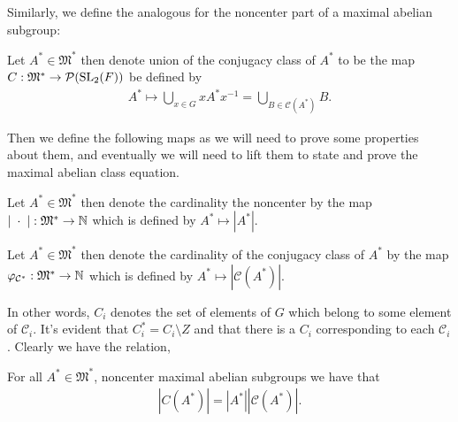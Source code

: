 Similarly, we define the analogous for the noncenter part of a maximal abelian subgroup:

\begin{definition}
  \label{noncenter_C}
  \leanok
  Let $A^* \in \mathfrak{M}^*$ then denote union of the conjugacy class of $A^*$ to be the
  map $C : \mathfrak{M}^* \rightarrow \mathcal{P}(\operatorname{SL}_2(F))$ be defined by
\begin{align*}
  A^* \mapsto \bigcup_{x \in G} x A^* x^{-1} = \bigcup_{B \in \mathcal{C}(A^*)} B.
\end{align*}
\end{definition}

Then we define the following maps as we will need to prove some properties about them, and eventually we will need to lift them to
state and prove the maximal abelian class equation.


\begin{definition}
  \label{card_noncenter}
  Let $A^* \in \mathfrak{M}^*$ then denote the cardinality the noncenter 
  by the map $| \; \cdot \; | : \mathfrak{M}^* \rightarrow \mathbb{N}$ which is defined by $A^* \mapsto |A^*|$.
\end{definition}

\begin{definition}
  \label{card_noncenter_ConjClassOfSet}
  Let $A^* \in \mathfrak{M}^*$ then denote the cardinality of the conjugacy class of $A^*$
  by the map $\varphi_{\mathcal{C}^*} : \mathfrak{M}^* \rightarrow \mathbb{N}$  which is defined by $A^* \mapsto |\mathcal{C}(A^*)|$.
\end{definition}

In other words, $C_i$ denotes the set of elements of $G$ which belong to some element of $\mathcal{C}_i$. It's evident that $C_i^* = C_i \setminus Z$ and that there is a $C_i$ corresponding to each $\mathcal{C}_i$. Clearly we have the relation,
\begin{lemma}
\label{card_noncenter_C_eq_noncenter_MaximalAbelianSubgroup_mul_noncenter_ConjClassOfSet}
For all $A^* \in \mathfrak{M}^*$, noncenter maximal abelian subgroups we have that
\begin{align} 
  |C(A^*)| = |A^*||\mathcal{C}(A^*)|.
\end{align}
\end{lemma}

